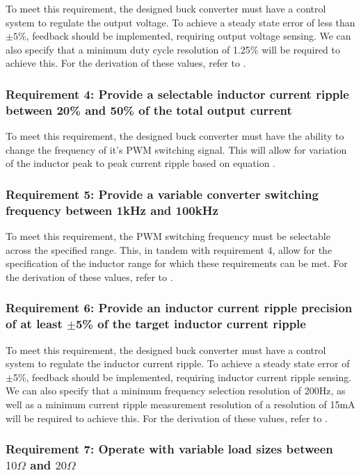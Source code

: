 To meet this requirement, the designed buck converter must have a control system to regulate the output voltage. To achieve a steady state error of less than $\pm5\%$, feedback should be implemented, requiring output voltage sensing. We can also specify that a minimum duty cycle resolution of 1.25\% will be required to achieve this. For the derivation of these values, refer to .

\subsubsection*{Requirement 4: Provide a selectable inductor current ripple between 20\% and 50\% of the total output current}

To meet this requirement, the designed buck converter must have the ability to change the frequency of it's PWM switching signal. This will allow for variation of the inductor peak to peak current ripple based on equation . 

\subsubsection*{Requirement 5: Provide a variable converter switching frequency between 1kHz and 100kHz}

To meet this requirement, the PWM switching frequency must be selectable across the specified range. This, in tandem with requirement 4, allow for the specification of the inductor range for which these requirements can be met. For the derivation of these values, refer to .

\subsubsection*{Requirement 6: Provide  an  inductor  current  ripple  precision  of  at  least $\pm$5\%  of  the  target  inductor current ripple}

To meet this requirement, the designed buck converter must have a control system to regulate the inductor current ripple. To achieve a steady state error of $\pm$5\%, feedback should be implemented, requiring inductor current ripple sensing. We can also specify that a minimum frequency selection resolution of 200Hz, as well as a minimum current ripple measurement resolution of a resolution of 15mA will be required to achieve this. For the derivation of these values, refer to .  


\subsubsection*{Requirement 7: Operate with variable load sizes between $10\Omega$ and $20\Omega$}

